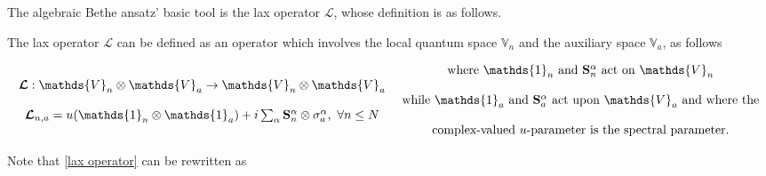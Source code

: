 \documentclass{homework}
\begin{document}
The algebraic Bethe ansatz' basic tool is the lax operator $\bm{\mathcal{L}}$, whose definition is as follows. 

\begin{df}
   The lax operator $\bm{\mathcal{L}}$ can be defined as an operator which involves the local quantum space $\mathds{V}_n$ and the auxiliary space $\mathds{V}_a$, as follows 

\begin{equation}
    \begin{array}{c}
         \bm{\mathcal{L}} : \mathds{V}_n \otimes \mathds{V}_a \rightarrow \mathds{V}_n \otimes \mathds{V}_a \\
         \\
         \bm{\mathcal{L}}_{n, a} = u(\mathds{1}_n \otimes \mathds{1}_a) + i \sum_{\alpha} \spin_n^\alpha \otimes \sigma_{a}^\alpha, \blanky \forall n \leq N \\
    \end{array} \begin{array}{c}
         \textnormal{ where $\mathds{1}_n$ and $\spin_n^\alpha$ act on $\mathds{V}_n $} \\
         \\
         \textnormal{ while $\mathds{1}_a$ and $\spin_a^\alpha$ act upon $\mathds{V}_a$ and where the}\\
         \\
         \textnormal{ complex-valued $u$-parameter is the spectral parameter.}
    \end{array}
    \label{lax operator}
\end{equation}
\end{df}

 Note that \cref{lax operator} can be rewritten as 
\end{document}
